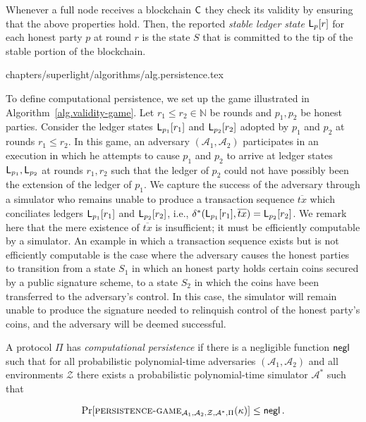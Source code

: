 Whenever a full node receives a blockchain $\mathsf{C}$ they check its validity by
ensuring that the above properties hold. Then, the reported \emph{stable ledger
state} $\mathsf{L}_{p}[r]$ for each honest party $p$ at round $r$ is the state $S$
that is committed to the tip of the stable portion of the blockchain.

{chapters/superlight/algorithms/alg.persistence.tex}

To define computational persistence, we set up the game illustrated in
Algorithm~\ref{alg.validity-game}.
Let
$r_1 \leq r_2 \in \mathbb{N}$ be rounds and $p_1, p_2$ be honest parties.
Consider the ledger states $\mathsf{L}_{p_1}[r_1]$ and $\mathsf{L}_{p_2}[r_2]$
adopted by $p_1$ and $p_2$ at rounds $r_1 \leq r_2$.
In this game, an adversary
$(\mathcal{A}_1, \mathcal{A}_2)$ participates in an execution in which he
attempts to cause $p_1$ and $p_2$ to arrive at ledger states
$\mathsf{L}_{p_1}, \mathsf{L}_{p_2}$ at rounds $r_1, r_2$ such that the ledger of
$p_2$ could not have possibly been the
extension of the ledger of $p_1$. We capture the success of the adversary
through a simulator who remains unable to produce a transaction sequence
$\overline{tx}$ which conciliates ledgers $\mathsf{L}_{p_1}[r_1]$ and
$\mathsf{L}_{p_2}[r_2]$, i.e.,
$\delta^*(\mathsf{L}_{p_1}[r_1], \overline{tx}) = \mathsf{L}_{p_2}[r_2]$. We remark
here that the mere existence of $\overline{tx}$ is insufficient; it must be
efficiently computable by a simulator. An example in which a transaction
sequence exists but is not efficiently computable is the case where the
adversary causes the honest parties to transition from a state $S_1$ in which
an honest party holds certain coins secured by a public signature scheme, to
a state $S_2$ in which the coins have been transferred to the adversary's
control. In this case, the simulator will remain unable to produce the signature
needed to relinquish control of the honest party's coins, and the adversary will
be deemed successful.

\begin{definition}
  A protocol $\Pi$ has \emph{computational persistence} if there is a negligible
  function $\mathsf{negl}$ such that for all probabilistic
  polynomial-time adversaries $(\mathcal{A}_1, \mathcal{A}_2)$ and all environments $\mathcal{Z}$
  there exists a probabilistic
  polynomial-time simulator $\mathcal{A}^*$ such that

  \[
  \Pr[\textsc{persistence}\textsc{-}\textsc{game}_{\mathcal{A}_1,\mathcal{A}_2,\mathcal{Z},\mathcal{A}^*,\Pi}(\kappa)]
  \leq \mathsf{negl}
  \,.
  \]
\end{definition}

